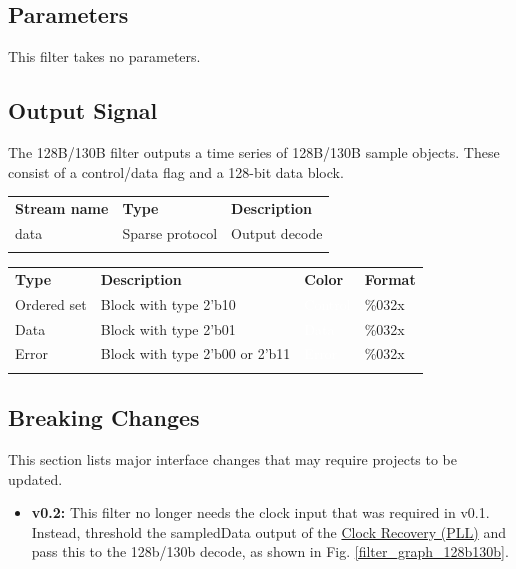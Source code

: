 \subsection{Parameters}

This filter takes no parameters.

\subsection{Output Signal}

The 128B/130B filter outputs a time series of 128B/130B sample objects. These consist of a control/data flag and
a 128-bit data block.

\begin{tabularx}{16cm}{llX}
\thickhline
\textbf{Stream name} & \textbf{Type} & \textbf{Description} \\
\thickhline
data & Sparse protocol & Output decode \\
\thickhline
\end{tabularx}

\begin{tabularx}{16cm}{lllX}
\thickhline
\textbf{Type} & \textbf{Description} & \textbf{Color} & \textbf{Format} \\
\thickhline
Ordered set & Block with type 2'b10 & \cellcolor{control}\textcolor{white}{Control} & \%032x \\
\thinhline
Data & Block with type 2'b01 & \cellcolor{data}\textcolor{white}{Data} & \%032x \\
\thinhline
Error & Block with type 2'b00 or 2'b11 & \cellcolor{error}\textcolor{white}{Error} & \%032x \\
\thickhline
\end{tabularx}

\subsection{Breaking Changes}

This section lists major interface changes that may require projects to be updated.

\begin{itemize}
\item \textbf{v0.2:} This filter no longer needs the clock input that was required in v0.1.
Instead, threshold the sampledData output of the \hyperref[filter:cdrpll]{Clock Recovery (PLL)} and pass this to the
128b/130b decode, as shown in Fig. \ref{filter_graph_128b130b}.
\end{itemize}

